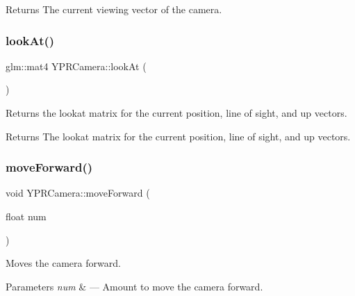 \begin{DoxyReturn}{Returns}
The current viewing vector of the camera. 
\end{DoxyReturn}
\mbox{\label{class_y_p_r_camera_a6312430157dfe879afee0af5f7759a87}} 
\subsubsection{\texorpdfstring{look\+At()}{lookAt()}}
{\footnotesize\ttfamily glm\+::mat4 Y\+P\+R\+Camera\+::look\+At (\begin{DoxyParamCaption}{ }\end{DoxyParamCaption})}



Returns the lookat matrix for the current position, line of sight, and up vectors. 

\begin{DoxyReturn}{Returns}
The lookat matrix for the current position, line of sight, and up vectors. 
\end{DoxyReturn}
\mbox{\label{class_y_p_r_camera_a3fa6a8dba8cea84cabb9155b030d849e}} 
\subsubsection{\texorpdfstring{move\+Forward()}{moveForward()}}
{\footnotesize\ttfamily void Y\+P\+R\+Camera\+::move\+Forward (\begin{DoxyParamCaption}\item[{float}]{num }\end{DoxyParamCaption})}



Moves the camera forward. 


\begin{DoxyParams}{Parameters}
{\em num} & --- Amount to move the camera forward. \\
\hline
\end{DoxyParams}
\mbox{\label{class_y_p_r_camera_a477ddad236b2b2d6cb2c8a7ae60cfa53}} 
